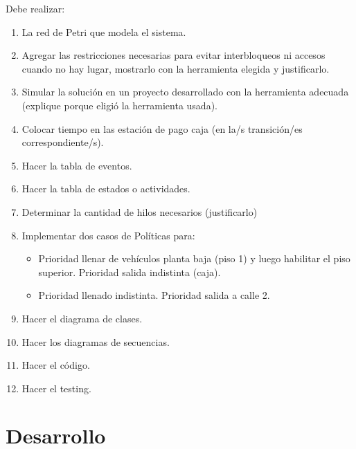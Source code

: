 \documentclass[12pt,a4paper]{article}
\begin{document}
Debe realizar:
\begin{enumerate}
\item La red de Petri que modela el sistema.
\item Agregar las restricciones necesarias para evitar interbloqueos ni accesos cuando no hay lugar, mostrarlo con la herramienta elegida y justificarlo.
\item Simular la solución en un proyecto desarrollado con la herramienta adecuada (explique porque eligió la herramienta usada).
\item Colocar tiempo en las estación de pago caja (en la/s transición/es correspondiente/s).
\item Hacer la tabla de eventos.
\item Hacer la tabla de estados o actividades.
\item Determinar la cantidad de hilos necesarios (justificarlo)
\item Implementar dos casos de Políticas para:

\begin{itemize}
\item Prioridad llenar de vehículos planta baja (piso 1) y luego habilitar el piso superior. Prioridad salida indistinta (caja).
\item Prioridad llenado indistinta. Prioridad salida a calle 2.
\end{itemize}

\item Hacer el diagrama de clases.
\item Hacer los diagramas de secuencias.
\item Hacer el código.
\item Hacer el testing.
\end{enumerate}

\section{Desarrollo}
\label{desarrollo}
\end{document}
